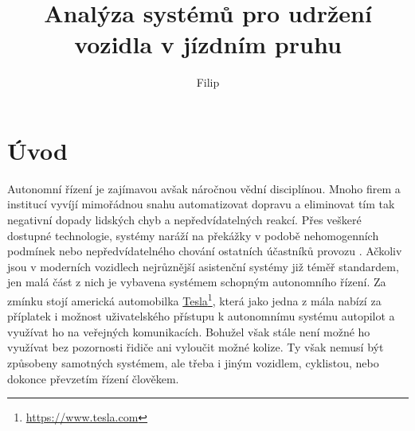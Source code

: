 \documentclass[czech, bc, kky, he, iso690numb]{fasthesis}
\title{Analýza systémů pro udržení vozidla v jízdním pruhu}
\author{Filip}{Jašek}{}{}
\begin{document}
    \frontpages[tm] %
    \tableofcontents
    \makeatletter%
    \ifx\FASThesis@style\c@fullcolor%
    \else%
    \fi%
    \makeatother%
	\chapter{Úvod}
		Autonomní řízení je zajímavou avšak náročnou vědní disciplínou. Mnoho firem a institucí vyvíjí mimořádnou snahu automatizovat dopravu a eliminovat tím tak negativní dopady lidských chyb a nepředvídatelných reakcí. Přes veškeré dostupné technologie, systémy naráží na překážky v podobě nehomogenních podmínek \cite{VIOLET} nebo nepředvídatelného chování ostatních účastníků provozu \cite{AV_crashes_involved_vulnerable, AV_vs_CV_crashes}. Ačkoliv jsou v moderních vozidlech nejrůznější asistenční systémy již téměř standardem, jen malá část z nich je vybavena systémem schopným autonomního řízení. Za zmínku stojí americká automobilka \href{https://www.tesla.com}{Tesla}\footnote{\href{https://www.tesla.com}{https://www.tesla.com}}, která jako jedna z mála nabízí za příplatek i možnost uživatelského přístupu k autonomnímu systému autopilot a využívat ho na veřejných komunikacích. Bohužel však stále není možné ho využívat bez pozornosti řidiče ani vyloučit možné kolize. Ty však nemusí být způsobeny samotných systémem, ale třeba i jiným vozidlem, cyklistou, nebo dokonce převzetím řízení člověkem.
		
\end{document}
